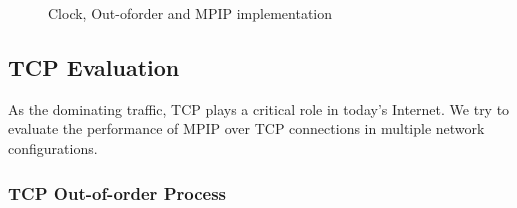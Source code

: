\begin{figure}
\caption{Clock, Out-oforder and MPIP implementation}
\label{fig.clockandoutoforder}
\end{figure}


\subsection{TCP Evaluation}
\label{sec:tcp}

As the dominating traffic, TCP plays a critical role in today's Internet. We try to evaluate the performance of MPIP over TCP connections in multiple network configurations. 

\subsubsection{TCP Out-of-order Process}
\label{sec:outoforder}

